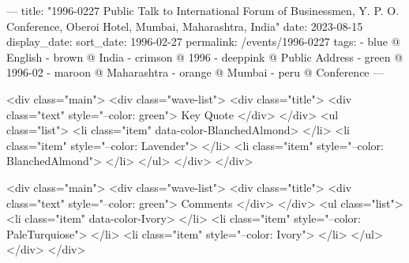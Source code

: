 ---
title: "1996-0227 Public Talk to International Forum of Businessmen, Y. P. O. Conference, Oberoi Hotel, Mumbai, Maharashtra, India"
date: 2023-08-15
display_date: 
sort_date: 1996-02-27
permalink: /events/1996-0227
tags:
  - blue @ English
  - brown @ India
  - crimson @ 1996
  - deeppink @ Public Address
  - green @ 1996-02
  - maroon @ Maharashtra
  - orange @ Mumbai
  - peru @ Conference
---

<div class="main">
  <div class="wave-list">
    <div class="title">
      <div class="text" style="--color: green">
        Key Quote
      </div>
    </div>
    <ul class="list">
        <li class="item" data-color-BlanchedAlmond>
        </li>
        <li class="item" style="--color: Lavender">
        </li>
        <li class="item" style="--color: BlanchedAlmond">
        </li>
      </ul>
  </div>
</div>

<div class="main">
  <div class="wave-list">
    <div class="title">
      <div class="text" style="--color: green">
        Comments
      </div>
    </div>
    <ul class="list">
        <li class="item" data-color-Ivory>
        </li>
        <li class="item" style="--color: PaleTurquiose">
        </li>
        <li class="item" style="--color: Ivory">
        </li>
      </ul>
  </div>
</div>